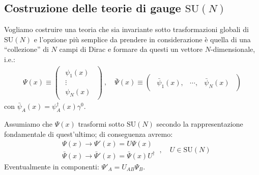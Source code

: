 \documentclass[../main.tex]{subfiles}
\begin{document}
\subsection{Costruzione delle teorie di gauge $\textrm{SU}(N)$}
Vogliamo costruire una teoria che sia invariante sotto trasformazioni globali di $\textrm{SU}(N)$ e l'opzione più semplice da prendere in considerazione è quella di una “collezione” di $N$ campi di Dirac e formare da questi un vettore $N$-dimensionale, i.e.:
\begin{align*}
    \Psi(x) \equiv 
    \begin{pmatrix}
        \begin{array}{c}
             \psi_1(x) \\
              \vdots\\
              \psi_N(x)
        \end{array}    
    \end{pmatrix}~,\quad
    \bar\Psi(x) \equiv 
    \begin{pmatrix}
        \begin{array}{ccc}
             \bar\psi_1(x), &    \cdots, &    \bar\psi_N(x)
        \end{array}    
    \end{pmatrix}
\end{align*}
con $\bar\psi_A(x)=\psi_A^\dagger(x)\gamma^0$.

Assumiamo che $\Psi(x)$ trasformi sotto $\textrm{SU}(N)$ secondo la rappresentazione fondamentale di quest'ultimo; di conseguenza avremo:
\begin{equation}
    \begin{aligned}
        &\Psi(x)\rightarrow\Psi'(x)=U\Psi(x)\\
        &\bar\Psi(x)\rightarrow\bar\Psi'(x)=\bar\Psi(x)U^\dagger
    \end{aligned}
    ~,\quad U\in\textrm{SU}(N)
    \label{eq:Psi_transform_SUN}
\end{equation}
Eventualmente in componenti: $\Psi'_A=U_{AB}\Psi_B$.
\end{document}
